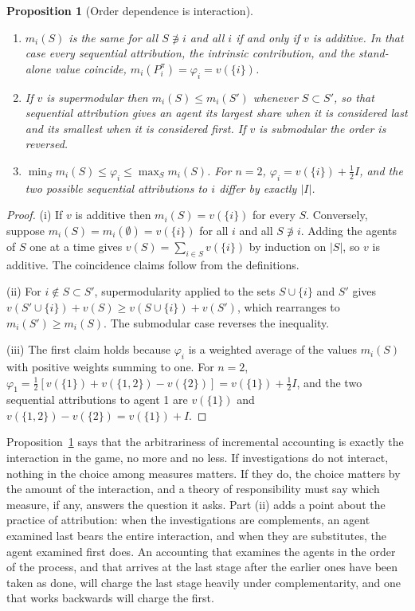 \documentclass[11pt]{article}
\theoremstyle{plain}
\newtheorem{proposition}{Proposition}
\theoremstyle{definition}
\begin{document}
\begin{proposition}[Order dependence is interaction]\label{prop:order}
\begin{enumerate}[label=(\roman*),nosep]
\item $m_i(S)$ is the same for all $S\not\ni i$ and all $i$ if and only if $v$ is additive. In that case every sequential attribution, the intrinsic contribution, and the stand-alone value coincide, $m_i(P^\pi_i)=\varphi_i=v(\{i\})$.
\item If $v$ is supermodular then $m_i(S)\le m_i(S')$ whenever $S\subset S'$, so that sequential attribution gives an agent its largest share when it is considered last and its smallest when it is considered first. If $v$ is submodular the order is reversed.
\item $\min_Sm_i(S)\le\varphi_i\le\max_Sm_i(S)$. For $n=2$, $\varphi_i=v(\{i\})+\tfrac12I$, and the two possible sequential attributions to $i$ differ by exactly $|I|$.
\end{enumerate}
\end{proposition}

\begin{proof}
(i) If $v$ is additive then $m_i(S)=v(\{i\})$ for every $S$. Conversely, suppose $m_i(S)=m_i(\emptyset)=v(\{i\})$ for all $i$ and all $S\not\ni i$. Adding the agents of $S$ one at a time gives $v(S)=\sum_{i\in S}v(\{i\})$ by induction on $|S|$, so $v$ is additive. The coincidence claims follow from the definitions.

(ii) For $i\notin S\subset S'$, supermodularity applied to the sets $S\cup\{i\}$ and $S'$ gives $v(S'\cup\{i\})+v(S)\ge v(S\cup\{i\})+v(S')$, which rearranges to $m_i(S')\ge m_i(S)$. The submodular case reverses the inequality.

(iii) The first claim holds because $\varphi_i$ is a weighted average of the values $m_i(S)$ with positive weights summing to one. For $n=2$, $\varphi_1=\tfrac12[v(\{1\})+v(\{1,2\})-v(\{2\})]=v(\{1\})+\tfrac12I$, and the two sequential attributions to agent 1 are $v(\{1\})$ and $v(\{1,2\})-v(\{2\})=v(\{1\})+I$.
\end{proof}

Proposition~\ref{prop:order} says that the arbitrariness of incremental accounting is exactly the interaction in the game, no more and no less. If investigations do not interact, nothing in the choice among measures matters. If they do, the choice matters by the amount of the interaction, and a theory of responsibility must say which measure, if any, answers the question it asks. Part (ii) adds a point about the practice of attribution: when the investigations are complements, an agent examined last bears the entire interaction, and when they are substitutes, the agent examined first does. An accounting that examines the agents in the order of the process, and that arrives at the last stage after the earlier ones have been taken as done, will charge the last stage heavily under complementarity, and one that works backwards will charge the first.
\end{document}
